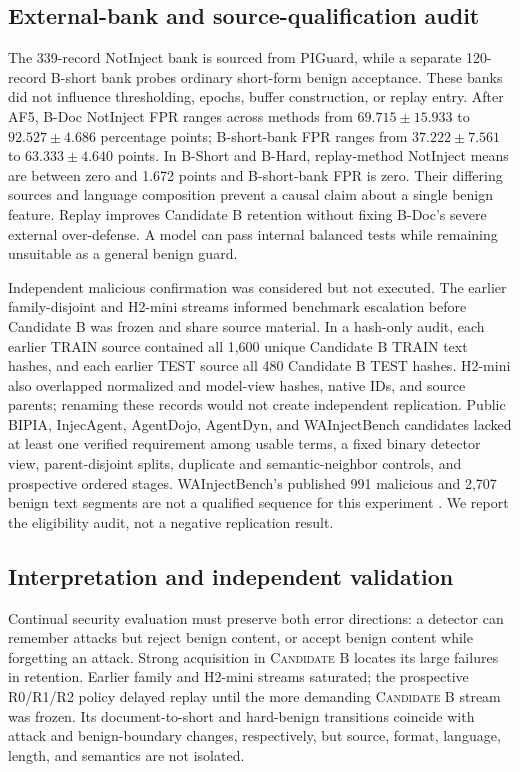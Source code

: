 \documentclass[conference]{IEEEtran}
\newcommand{\candb}{\textsc{Candidate B}}
\begin{document}
\subsection{External-bank and source-qualification audit}
The 339-record NotInject bank is sourced from PIGuard, while a separate 120-record B-short bank probes ordinary short-form benign acceptance. These banks did not influence thresholding, epochs, buffer construction, or replay entry. After AF5, B-Doc NotInject FPR ranges across methods from $69.715\pm15.933$ to $92.527\pm4.686$ percentage points; B-short-bank FPR ranges from $37.222\pm7.561$ to $63.333\pm4.640$ points. In B-Short and B-Hard, replay-method NotInject means are between zero and 1.672 points and B-short-bank FPR is zero. Their differing sources and language composition prevent a causal claim about a single benign feature. Replay improves Candidate B retention without fixing B-Doc's severe external over-defense. A model can pass internal balanced tests while remaining unsuitable as a general benign guard.



Independent malicious confirmation was considered but not executed. The earlier family-disjoint and H2-mini streams informed benchmark escalation before Candidate B was frozen and share source material. In a hash-only audit, each earlier TRAIN source contained all 1,600 unique Candidate B TRAIN text hashes, and each earlier TEST source all 480 Candidate B TEST hashes. H2-mini also overlapped normalized and model-view hashes, native IDs, and source parents; renaming these records would not create independent replication. Public BIPIA, InjecAgent, AgentDojo, AgentDyn, and WAInjectBench candidates lacked at least one verified requirement among usable terms, a fixed binary detector view, parent-disjoint splits, duplicate and semantic-neighbor controls, and prospective ordered stages. WAInjectBench's published 991 malicious and 2,707 benign text segments are not a qualified sequence for this experiment \cite{liu2026wainjectbench}. We report the eligibility audit, not a negative replication result.
\subsection{Interpretation and independent validation}
Continual security evaluation must preserve both error directions: a detector can remember attacks but reject benign content, or accept benign content while forgetting an attack. Strong acquisition in \candb{} locates its large failures in retention. Earlier family and H2-mini streams saturated; the prospective R0/R1/R2 policy delayed replay until the more demanding \candb{} stream was frozen. Its document-to-short and hard-benign transitions coincide with attack and benign-boundary changes, respectively, but source, format, language, length, and semantics are not isolated.
\end{document}
